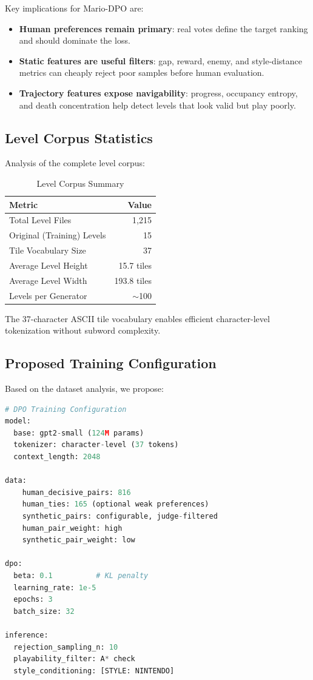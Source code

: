 \documentclass[11pt,a4paper]{article}
\theoremstyle{plain}
\theoremstyle{definition}
\theoremstyle{remark}
\begin{document}
Key implications for Mario-DPO are:
\begin{itemize}
    \item \textbf{Human preferences remain primary}: real votes define the target ranking and should dominate the loss.
    \item \textbf{Static features are useful filters}: gap, reward, enemy, and style-distance metrics can cheaply reject poor samples before human evaluation.
    \item \textbf{Trajectory features expose navigability}: progress, occupancy entropy, and death concentration help detect levels that look valid but play poorly.
\end{itemize}

\subsection{Level Corpus Statistics}
\label{subsec:corpus-stats}

Analysis of the complete level corpus:

\begin{table}[H]
\centering
\caption{Level Corpus Summary}
\label{tab:corpus-summary}
\begin{tabular}{lr}
\toprule
\textbf{Metric} & \textbf{Value} \\
\midrule
Total Level Files & 1,215 \\
Original (Training) Levels & 15 \\
Tile Vocabulary Size & 37 \\
Average Level Height & 15.7 tiles \\
Average Level Width & 193.8 tiles \\
Levels per Generator & $\sim$100 \\
\bottomrule
\end{tabular}
\end{table}

The 37-character ASCII tile vocabulary enables efficient character-level tokenization without subword complexity.

\subsection{Proposed Training Configuration}
\label{subsec:training-config}

Based on the dataset analysis, we propose:

\begin{lstlisting}[language=Python,caption=Mario-DPO Training Configuration]
# DPO Training Configuration
model:
  base: gpt2-small (124M params)
  tokenizer: character-level (37 tokens)
  context_length: 2048

data:
    human_decisive_pairs: 816
    human_ties: 165 (optional weak preferences)
    synthetic_pairs: configurable, judge-filtered
    human_pair_weight: high
    synthetic_pair_weight: low

dpo:
  beta: 0.1          # KL penalty
  learning_rate: 1e-5
  epochs: 3
  batch_size: 32

inference:
  rejection_sampling_n: 10
  playability_filter: A* check
  style_conditioning: [STYLE: NINTENDO]
\end{lstlisting}
\end{document}
